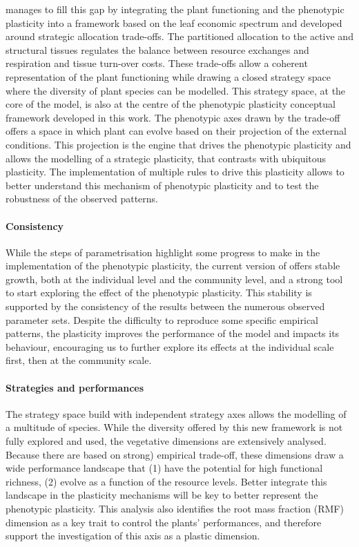 \model manages to fill this gap by integrating the plant functioning and the phenotypic plasticity into a framework based on the leaf economic spectrum and developed around strategic allocation trade-offs. The partitioned allocation to the active and structural tissues regulates the balance between resource exchanges and respiration and tissue turn-over costs. These trade-offs allow a coherent representation of the plant functioning while drawing a closed strategy space where the diversity of plant species can be modelled. This strategy space, at the core of the model, is also at the centre of the phenotypic plasticity conceptual framework developed in this work. The phenotypic axes drawn by the trade-off offers a space in which plant can evolve  based on their projection of the external conditions. This projection is the engine that drives the phenotypic plasticity and allows the modelling of a strategic plasticity, that contrasts with ubiquitous plasticity. The implementation of multiple rules to drive this plasticity allows to better understand this mechanism of phenotypic plasticity and to test the robustness of the observed patterns.


\paragraph{Consistency}

While the steps of parametrisation highlight some progress to make in the implementation of the phenotypic plasticity, the current version of \model offers stable growth, both at the individual level and the community level, and a strong tool to start exploring the effect of the phenotypic plasticity. This stability is supported by the consistency of the results between the numerous observed parameter sets. Despite the difficulty to reproduce some specific empirical patterns, the plasticity improves the performance of the model and impacts its behaviour, encouraging us to further explore its effects at the individual scale first, then at the community scale.

\paragraph{Strategies and performances}

The strategy space build with independent strategy axes allows the modelling of a multitude of species. While the diversity offered by this new framework is not fully explored and used, the vegetative dimensions are extensively analysed. Because there are based on strong) empirical trade-off, these dimensions draw a wide performance landscape that (1) have the potential for high functional richness, (2) evolve as a function of the resource levels. Better integrate this landscape in the plasticity mechanisms will be key to better represent the phenotypic plasticity. This analysis also identifies the root mass fraction (RMF) dimension as a key trait to control the plants' performances, and therefore support the investigation of this axis as a plastic dimension.


